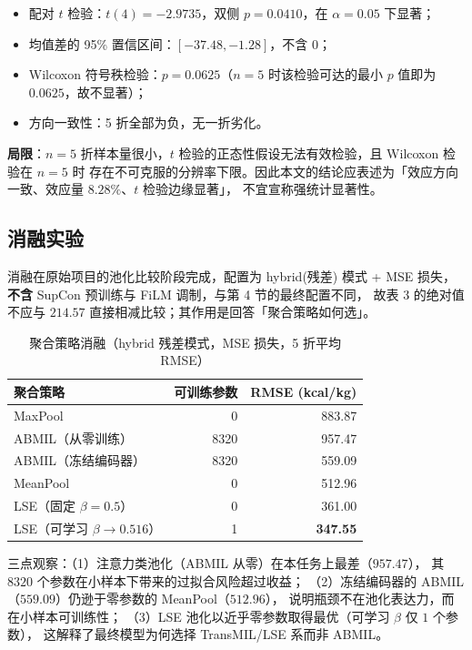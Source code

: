\documentclass[11pt,a4paper,UTF8]{ctexart}
\begin{document}
\begin{itemize}
\item 配对 $t$ 检验：$t(4) = -2.9735$，双侧 $p = 0.0410$，在 $\alpha=0.05$ 下显著；
\item 均值差的 95\% 置信区间：$[-37.48, -1.28]$，不含 $0$；
\item Wilcoxon 符号秩检验：$p = 0.0625$（$n=5$ 时该检验可达的最小 $p$ 值即为 $0.0625$，故不显著）；
\item 方向一致性：5 折全部为负，无一折劣化。
\end{itemize}

\textbf{局限}：$n=5$ 折样本量很小，$t$ 检验的正态性假设无法有效检验，且 Wilcoxon 检验在 $n=5$ 时
存在不可克服的分辨率下限。因此本文的结论应表述为「效应方向一致、效应量 $8.28\%$、$t$ 检验边缘显著」，
不宜宣称强统计显著性。

\subsection{消融实验}
\label{sec:ablation}
消融在原始项目的池化比较阶段完成，配置为 hybrid(残差) 模式 + MSE 损失，
\textbf{不含} SupCon 预训练与 FiLM 调制，与第 4 节的最终配置不同，
故表 3 的绝对值不应与 $214.57$ 直接相减比较；其作用是回答「聚合策略如何选」。

\begin{table}[htbp]
\centering\caption{聚合策略消融（hybrid 残差模式，MSE 损失，5 折平均 RMSE）}
\begin{tabular}{lrr}
\toprule
聚合策略 & 可训练参数 & RMSE (kcal/kg) \\
\midrule
MaxPool            & 0      & 883.87 \\
ABMIL（从零训练）  & 8320   & 957.47 \\
ABMIL（冻结编码器）& 8320   & 559.09 \\
MeanPool           & 0      & 512.96 \\
LSE（固定 $\beta=0.5$）     & 0 & 361.00 \\
LSE（可学习 $\beta \to 0.516$） & 1 & \textbf{347.55} \\
\bottomrule
\end{tabular}
\end{table}

三点观察：（1）注意力类池化（ABMIL 从零）在本任务上最差（$957.47$），
其 $8320$ 个参数在小样本下带来的过拟合风险超过收益；
（2）冻结编码器的 ABMIL（$559.09$）仍逊于零参数的 MeanPool（$512.96$），
说明瓶颈不在池化表达力，而在小样本可训练性；
（3）LSE 池化以近乎零参数取得最优（可学习 $\beta$ 仅 $1$ 个参数），
这解释了最终模型为何选择 TransMIL/LSE 系而非 ABMIL。
\end{document}
